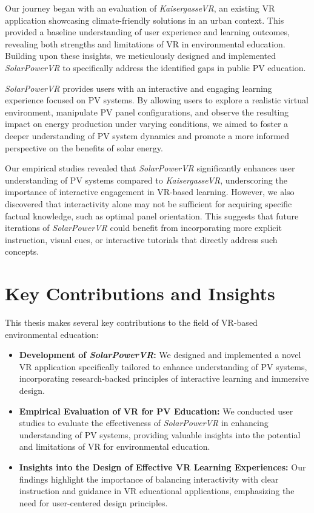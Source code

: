 \documentclass[draft, final]{vutinfth} %
\begin{document}
Our journey began with an evaluation of \textit{KaisergasseVR}, an existing VR application showcasing climate-friendly solutions in an urban context. This provided a baseline understanding of user experience and learning outcomes, revealing both strengths and limitations of VR in environmental education.  Building upon these insights, we meticulously designed and implemented \textit{SolarPowerVR} to specifically address the identified gaps in public PV education. 

\textit{SolarPowerVR} provides users with an interactive and engaging learning experience focused on PV systems.  By allowing users to explore a realistic virtual environment, manipulate PV panel configurations, and observe the resulting impact on energy production under varying conditions, we aimed to foster a deeper understanding of PV system dynamics and promote a more informed perspective on the benefits of solar energy.

Our empirical studies revealed that \textit{SolarPowerVR} significantly enhances user understanding of PV systems compared to \textit{KaisergasseVR}, underscoring the importance of interactive engagement in VR-based learning.  However, we also discovered that interactivity alone may not be sufficient for acquiring specific factual knowledge, such as optimal panel orientation. This suggests that future iterations of \textit{SolarPowerVR} could benefit from incorporating more explicit instruction, visual cues, or interactive tutorials that directly address such concepts.

\section{Key Contributions and Insights}

This thesis makes several key contributions to the field of VR-based environmental education:

\begin{itemize}
    \item \textbf{Development of \textit{SolarPowerVR}:} We designed and implemented a novel VR application specifically tailored to enhance understanding of PV systems, incorporating research-backed principles of interactive learning and immersive design.
    \item \textbf{Empirical Evaluation of VR for PV Education:} We conducted user studies to evaluate the effectiveness of \textit{SolarPowerVR} in enhancing understanding of PV systems, providing valuable insights into the potential and limitations of VR for environmental education.
    \item \textbf{Insights into the Design of Effective VR Learning Experiences:} Our findings highlight the importance of balancing interactivity with clear instruction and guidance in VR educational applications, emphasizing the need for user-centered design principles.
\end{itemize}
\end{document}
